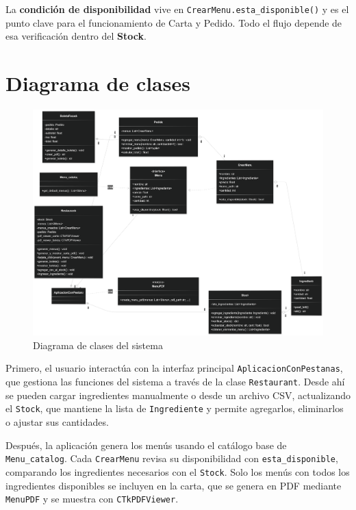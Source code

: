 \documentclass[12pt,a4paper]{article}
\newcommand{\codehl}[1]{\colorbox{yellow!30}{\texttt{#1}}}
\begin{document}
\begin{tcolorbox}[colback=yellow!8,colframe=yellow!40!black,title=\large Highlight del flujo]
La \textbf{condición de disponibilidad} vive en \codehl{CrearMenu.esta\_disponible()} y es el punto clave para el funcionamiento de Carta y Pedido. Todo el flujo depende de esa verificación dentro del \textbf{Stock}.
\end{tcolorbox}
\newpage

\section{Diagrama de clases}
\begin{figure}[H]
  \centering
  \includegraphics[width=\textwidth]{diagramaclases}
  \caption{Diagrama de clases del sistema}
  \label{fig:diagrama_clases}
\end{figure}

Primero, el usuario interactúa con la interfaz principal \texttt{AplicacionConPestanas}, que gestiona las funciones del sistema a través de la clase \texttt{Restaurant}. Desde ahí se pueden cargar ingredientes manualmente o desde un archivo CSV, actualizando el \texttt{Stock}, que mantiene la lista de \texttt{Ingrediente} y permite agregarlos, eliminarlos o ajustar sus cantidades.

Después, la aplicación genera los menús usando el catálogo base de \texttt{Menu\_catalog}. Cada \texttt{CrearMenu} revisa su disponibilidad con \texttt{esta\_disponible}, comparando los ingredientes necesarios con el \texttt{Stock}. Solo los menús con todos los ingredientes disponibles se incluyen en la carta, que se genera en PDF mediante \texttt{MenuPDF} y se muestra con \texttt{CTkPDFViewer}.
\end{document}
